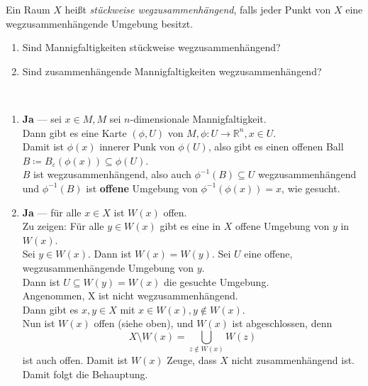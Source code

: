 \begin{assignment}
  Ein Raum \( X \) heißt \emph{stückweise wegzusammenhängend}, falls jeder Punkt von \( X \) eine wegzusammenhängende Umgebung besitzt.
  \begin{enumerate}[label=(\alph*)]
    \item Sind Mannigfaltigkeiten stückweise wegzusammenhängend?
    \item Sind zusammenhängende Mannigfaltigkeiten wegzusammenhängend?
  \end{enumerate}
\end{assignment}
\begin{solution}
  \
  \begin{enumerate}[label=(\alph*)]
    \item \textbf{Ja} --- sei \( x \in M, M \) sei \( n \)-dimensionale Mannigfaltigkeit. \\
    Dann gibt es eine Karte \( (\phi, U) \) von \( M, \phi: U \to \mathbb{R}^n, x \in U \). \\
    Damit ist \( \phi(x) \) innerer Punk von \( \phi(U) \), also gibt es einen offenen Ball \\ \( B \coloneqq B_\varepsilon(\phi(x)) \subseteq \phi(U) \). \\
    \( B \) ist wegzusammenhängend, also auch \( \phi^{-1}(B) \subseteq U \) wegzusammenhängend und \( \phi^{-1}(B) \) ist \textbf{offene} Umgebung von \( \phi^{-1}(\phi(x)) = x \), wie gesucht.

    \item \textbf{Ja} --- für alle \( x \in X \) ist \( W(x) \) offen. \\
    Zu zeigen: Für alle \( y \in W(x) \) gibt es eine in \( X \) offene Umgebung von \( y \) in \( W(x) \). \\
    Sei \( y \in W(x) \). Dann ist \( W(x) = W(y) \). Sei \( U \) eine offene, wegzusammenhängende Umgebung von \( y \). \\
    Dann ist \( U \subseteq W(y) = W(x) \) die gesuchte Umgebung. \\
    Angenommen, X ist nicht wegzusammenhängend. \\
    Dann gibt es \( x,y \in X \) mit \( x \in W(x), y \notin W(x) \). \\
    Nun ist \( W(x) \) offen (siehe oben), und \( W(x) \) ist abgeschlossen, denn
    \begin{equation*}
      X \setminus W(x) = \bigcup_{z \notin W(x)} W(z)
    \end{equation*}
    ist auch offen. Damit ist \( W(x) \) Zeuge, dass \( X \) nicht zusammenhängend ist. Damit folgt die Behauptung.
  \end{enumerate}
\end{solution}



